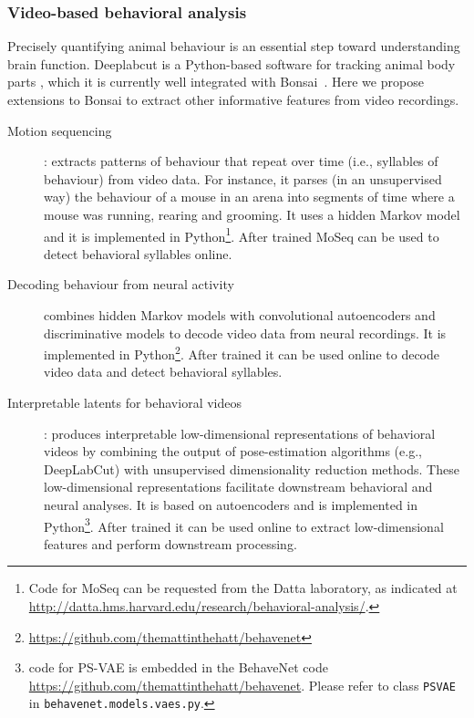\subsubsection{Video-based behavioral analysis}
\label{sec:videoBasedBehavioralAnalysis}

Precisely quantifying animal behaviour is an essential step toward understanding
brain function.  Deeplabcut is a Python-based software for tracking animal body
parts \citep{mathisEtAl18}, which it is currently well integrated with
Bonsai~\citep{kaneEtAl20}. Here we propose extensions to Bonsai to extract
other informative features from video recordings.

\begin{description}

    \item[Motion sequencing]\citep[MoSeq;][]{wiltschkoEtAl15}: extracts patterns
        of behaviour that repeat over time (i.e., syllables of behaviour) from
        video data. For instance, it parses (in an unsupervised way) the
        behaviour of a mouse in an arena into segments of time where a mouse
        was running, rearing and grooming. It uses a hidden Markov model and it
        is implemented in Python\footnote{Code for MoSeq can be requested from
        the Datta laboratory, as indicated at
        \href{http://datta.hms.harvard.edu/research/behavioral-analysis/}{http://datta.hms.harvard.edu/research/behavioral-analysis/}.}.
        After trained MoSeq can be used to detect behavioral syllables online.

    \item[Decoding behaviour from neural
        activity]\citep[BehaveNet;][]{battyEtAl19} combines hidden Markov
        models with convolutional autoencoders and discriminative models to
        decode video data from neural recordings. It is implemented in
        Python\footnote{\href{https://github.com/themattinthehatt/behavenet}{https://github.com/themattinthehatt/behavenet}}.
        After trained it can be used online to decode video data and detect
        behavioral syllables.

    \item[Interpretable latents for behavioral videos]\citep[Partitioned
        Subspace Variational Autoencoder, PS-VAE;][]{whitewayEtAl21}: produces
        interpretable low-dimensional representations of behavioral videos by
        combining the output of pose-estimation algorithms (e.g., DeepLabCut)
        with unsupervised dimensionality reduction methods. These
        low-dimensional representations facilitate downstream behavioral and
        neural analyses. It is based on autoencoders and is implemented in
        Python\footnote{code for PS-VAE is embedded in the BehaveNet code
        \href{https://github.com/themattinthehatt/behavenet}{https://github.com/themattinthehatt/behavenet}.
        Please refer to class \texttt{PSVAE} in 
        \texttt{behavenet.models.vaes.py}.}. After trained it can be used
        online to extract low-dimensional features and perform downstream
        processing.

\end{description}

